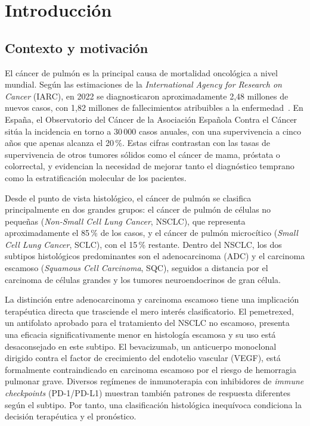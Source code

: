 \chapter{Introducción}
\label{cap:introduccion}

\section{Contexto y motivación}
\label{sec:contexto}

El cáncer de pulmón es la principal causa de mortalidad oncológica a nivel
mundial. Según las estimaciones de la \emph{International Agency for Research
on Cancer} (IARC), en 2022 se diagnosticaron aproximadamente 2,48 millones
de nuevos casos, con 1,82 millones de fallecimientos atribuibles a la
enfermedad~\cite{sung2022global}. En España, el Observatorio del Cáncer de la
Asociación Española Contra el Cáncer sitúa la incidencia en torno a 30\,000
casos anuales, con una supervivencia a cinco años que apenas alcanza el
20\,\%. Estas cifras contrastan con las tasas de supervivencia de otros
tumores sólidos como el cáncer de mama, próstata o colorrectal, y evidencian
la necesidad de mejorar tanto el diagnóstico temprano como la
estratificación molecular de los pacientes.

Desde el punto de vista histológico, el cáncer de pulmón se clasifica
principalmente en dos grandes grupos: el cáncer de pulmón de células no
pequeñas (\emph{Non-Small Cell Lung Cancer}, NSCLC), que representa
aproximadamente el 85\,\% de los casos, y el cáncer de pulmón microcítico
(\emph{Small Cell Lung Cancer}, SCLC), con el 15\,\% restante. Dentro del
NSCLC, los dos subtipos histológicos predominantes son el adenocarcinoma
(ADC) y el carcinoma escamoso (\emph{Squamous Cell Carcinoma}, SQC),
seguidos a distancia por el carcinoma de células grandes y los tumores
neuroendocrinos de gran célula.

La distinción entre adenocarcinoma y carcinoma escamoso tiene una
implicación terapéutica directa que trasciende el mero interés
clasificatorio. El pemetrexed, un antifolato aprobado para el tratamiento
del NSCLC no escamoso, presenta una eficacia significativamente menor en
histología escamosa y su uso está desaconsejado en este subtipo. El
bevacizumab, un anticuerpo monoclonal dirigido contra el factor de
crecimiento del endotelio vascular (VEGF), está formalmente
contraindicado en carcinoma escamoso por el riesgo de hemorragia pulmonar
grave. Diversos regímenes de inmunoterapia con inhibidores de \emph{immune
checkpoints} (PD-1/PD-L1) muestran también patrones de respuesta
diferentes según el subtipo. Por tanto, una clasificación histológica
inequívoca condiciona la decisión terapéutica y el pronóstico.

